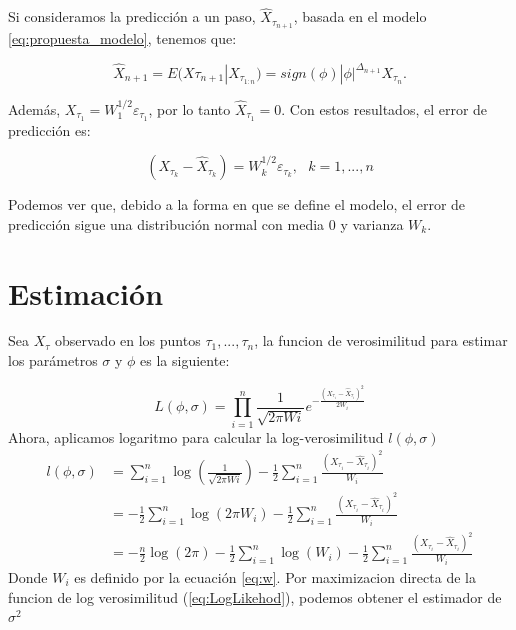 Si consideramos la predicción a un paso, $\hat{X}_{\tau_{n+1}}$, basada en el modelo \ref{eq:propuesta_modelo}, tenemos que:

\begin{equation}
\hat{X}_{n+1} = E(X{\tau_{n+1}}|X_{\tau_{1:n}}) = sign(\phi)|\phi|^{\Delta_{n+1}}X_{\tau_{n}}.
\end{equation}

Además, $X_{\tau_1} = W_1^{1/2}\varepsilon_{\tau_1}$, por lo tanto $\hat{X}_{\tau_1}=0$. Con estos resultados, el error de predicción es:

\begin{equation}
(X_{\tau_k} - \hat{X}_{\tau_k}) = W_{k}^{1/2}\varepsilon_{\tau_k}, \text{ } k=1,...,n
\end{equation}

Podemos ver que, debido a la forma en que se define el modelo, el error de predicción sigue una distribución normal con media 0 y varianza $W_k$.

\section{Estimación}

Sea $X_\tau$ observado en los puntos $\tau_1, ..., \tau_n$, la funcion de verosimilitud para estimar los
parámetros $\sigma$ y $\phi$ es la siguiente:

\begin{equation}
   L(\phi, \sigma) = \prod_{i=1}^{n}\frac{1}{\sqrt{2\pi Wi}}e^{-\frac{\left( X_{\tau_i} - \hat{X}_{\tau_i}\right)^2}{2W_i}}
\end{equation}
Ahora, aplicamos logaritmo para calcular la log-verosimilitud $l(\phi,\sigma)$
\begin{equation}
   \begin{split}
       l(\phi,\sigma) &= \sum_{i=1}^{n}\log\left(\frac{1}{\sqrt{2\pi Wi}}\right) -\frac{1}{2}\sum_{i=1}^{n}\frac{\left( X_{\tau_i} - \hat{X}_{\tau_i}\right)^2}{W_i}\\
                      &= -\frac{1}{2}\sum_{i=1}^{n}\log\left(2\pi W_i\right) -\frac{1}{2}\sum_{i=1}^{n}\frac{\left( X_{\tau_i} - \hat{X}_{\tau_i}\right)^2}{W_i}\\
                      &= -\frac{n}{2}\log(2\pi)-\frac{1}{2}\sum_{i=1}^{n}\log(W_i)  -\frac{1}{2}\sum_{i=1}^{n}\frac{\left( X_{\tau_i} - \hat{X}_{\tau_i}\right)^2}{W_i}
   \end{split}
   \label{eq:LogLikehod}
\end{equation}
Donde $W_i$ es definido por la ecuación \ref{eq:w}. Por maximizacion directa de la funcion de log verosimilitud (\ref{eq:LogLikehod}), podemos obtener el estimador de $\sigma^2$

